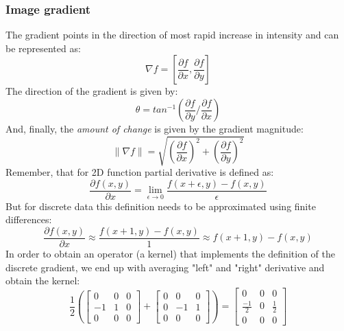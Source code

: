 \subsubsection{Image gradient}
The gradient points in the direction of most rapid increase in intensity and can be represented as:
\begin{equation}
	\nabla f = [\frac{\partial f}{\partial x}, \frac{\partial f}{\partial y}]
\end{equation}
The direction of the gradient is given by:
\begin{equation}
	\theta = tan^{-1}(\frac{\partial f}{\partial y} / \frac{\partial f}{\partial x})
\end{equation}
And, finally, the \textit{amount of change} is given by the gradient magnitude:
\begin{equation}
	\parallel \nabla f \parallel = \sqrt{(\frac{\partial f}{\partial x})^2 + (\frac{\partial f}{\partial y})^2}
\end{equation}
Remember, that for 2D function partial derivative is defined as:
\begin{equation}
	\frac{\partial f(x,y)}{\partial x} = \lim_{\epsilon \to 0} \frac{f(x + \epsilon, y) - f(x, y)}{\epsilon}
\end{equation}
But for discrete data this definition needs to be approximated using finite differences:
\begin{equation}
	\frac{\partial f(x,y)}{\partial x} \approx \frac{f(x + 1, y) - f(x, y)}{1} \approx f(x + 1, y) - f(x, y)
\end{equation}
In order to obtain an operator (a kernel) that implements the definition of the discrete gradient, we end up with averaging "left" and "right" derivative and obtain the kernel:
\[
\frac{1}{2}
(\begin{bmatrix}
    0 & 0 & 0 \\
    -1 & 1 & 0 \\
    0 & 0 & 0
\end{bmatrix}
+
\begin{bmatrix}
    0 & 0 & 0 \\
    0 & -1 & 1 \\
    0 & 0 & 0
\end{bmatrix})
=
\begin{bmatrix}
    0 & 0 & 0 \\
    \frac{-1}{2} & 0 & \frac{1}{2} \\
    0 & 0 & 0
\end{bmatrix}
\]

